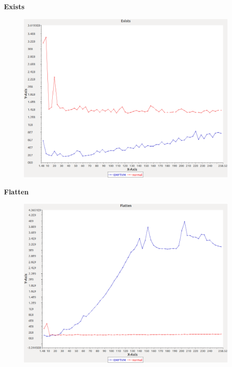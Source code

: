 \noindent\textbf{Exists}

\begin{figure}[h]
\centering
\includegraphics[width=\textwidth]{graphs/set/Exists}
\end{figure}
\pagebreak

\noindent\textbf{Flatten}

\begin{figure}[h]
\centering
\includegraphics[width=\textwidth]{graphs/set/Flatten}
\end{figure}
\pagebreak

